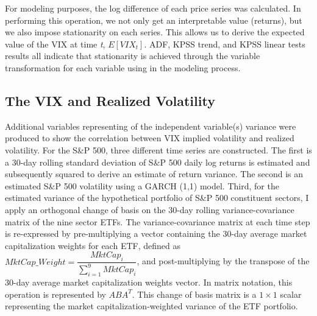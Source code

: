 \documentclass[11pt,a4paper,oldfontcommands]{memoir}
\begin{document}
{For modeling purposes, the log difference of each price series was calculated. In performing this operation, we not only get an interpretable value (returns), but we also impose stationarity on each series. This allows us to derive the expected value of the VIX at time \emph{t}, $E[VIX_t]$. ADF, KPSS trend, and KPSS linear tests results all indicate that stationarity is achieved through the variable transformation for each variable using in the modeling process. 

\subsection{The VIX and Realized Volatility}

Additional variables representing of the independent variable(s) variance were produced to show the correlation between VIX implied volatility and realized volatility. For the S\&P 500, three different time series are constructed. The first is a 30-day rolling standard deviation of S\&P 500 daily log returns is estimated and subsequently squared to derive an estimate of return variance. The second is an estimated S\&P 500 volatility using a GARCH (1,1) model. Third, for the estimated variance of the hypothetical portfolio of S\&P 500 constituent sectors, I apply an orthogonal change of basis on the 30-day rolling variance-covariance matrix of the nine sector ETFs. The variance-covariance matrix at each time step is re-expressed by pre-multiplying a vector containing the 30-day average market capitalization weights for each ETF, defined as $MktCap\_Weight = \dfrac{MktCap_i}{\sum_{i=1}^{9}MktCap_i}$, and post-multiplying by the transpose of the 30-day average market capitalization weights vector. In matrix notation, this operation is represented by $ABA^T$. This change of basis matrix is a $1\times 1$ scalar representing the market capitalization-weighted variance of the ETF portfolio. 

}
\end{document}
